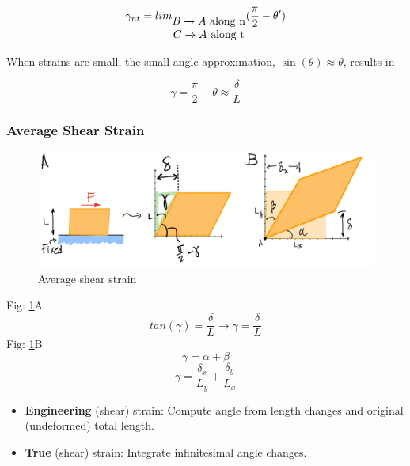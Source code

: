 \[ \gamma_{nt} = lim_{\begin{matrix} B \xrightarrow{} A \rm\ along \rm\ n\\ C \xrightarrow{} A \rm\ along \rm\ t \end{matrix}} (\frac{\pi}{2} - \theta') \]


\noindent When strains are small, the small angle approximation, $\sin(\theta)\approx \theta$, results in

\[\gamma = \frac{\pi}{2} - \theta \approx \frac{\delta}{L}\]

\subsubsection{Average Shear Strain}

\begin{figure}[!h]
\centering
\includegraphics[angle=0, width=5in]{Strain-Figures/Avg Shear Strain.png}
\vspace{-2mm}
\caption{\small Average shear strain}
\vspace{-3mm}
\label{Fig:Avg Shear Strain}
\end{figure}

\noindent  Fig: \ref{Fig:Avg Shear Strain}A
\[tan(\gamma) = \frac{\delta}{L} \xrightarrow{} \gamma = \frac{\delta}{L}\]
\noindent Fig: \ref{Fig:Avg Shear Strain}B
\[\gamma = \alpha + \beta\]
\[\gamma = \frac{\delta_x}{L_y} + \frac{\delta_y}{L_x}\]


\begin{itemize}
    \item \textbf{Engineering} (shear) strain: Compute angle from length changes and original (undeformed) total length.
    \item \textbf{True} (shear) strain: Integrate infinitesimal angle changes.
\end{itemize}


